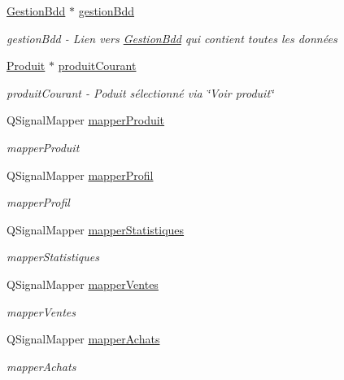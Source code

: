\begin{DoxyCompactItemize}
\hyperlink{class_gestion_bdd}{Gestion\-Bdd} $\ast$ \hyperlink{class_ma_fenetre_a34d71a96cedb508c72afb02c70ff9609}{gestion\-Bdd}
\begin{DoxyCompactList}\small\item\em gestion\-Bdd -\/ Lien vers \hyperlink{class_gestion_bdd}{Gestion\-Bdd} qui contient toutes les données \end{DoxyCompactList}\item 
\hyperlink{class_produit}{Produit} $\ast$ \hyperlink{class_ma_fenetre_abc16cc0e7668b65019bffe2d595be2a0}{produit\-Courant}
\begin{DoxyCompactList}\small\item\em produit\-Courant -\/ Poduit sélectionné via \char`\"{}\-Voir produit\char`\"{} \end{DoxyCompactList}\item 
Q\-Signal\-Mapper \hyperlink{class_ma_fenetre_a7345ec3b89dedf18ae6297d77c5653b4}{mapper\-Produit}
\begin{DoxyCompactList}\small\item\em mapper\-Produit \end{DoxyCompactList}\item 
Q\-Signal\-Mapper \hyperlink{class_ma_fenetre_a0629af8324c4d673fe70f55ead4e7b8a}{mapper\-Profil}
\begin{DoxyCompactList}\small\item\em mapper\-Profil \end{DoxyCompactList}\item 
Q\-Signal\-Mapper \hyperlink{class_ma_fenetre_ad5133adcd9cb734a07b9534996224d15}{mapper\-Statistiques}
\begin{DoxyCompactList}\small\item\em mapper\-Statistiques \end{DoxyCompactList}\item 
Q\-Signal\-Mapper \hyperlink{class_ma_fenetre_a68f5911be4ba075ef635413eee34b623}{mapper\-Ventes}
\begin{DoxyCompactList}\small\item\em mapper\-Ventes \end{DoxyCompactList}\item 
Q\-Signal\-Mapper \hyperlink{class_ma_fenetre_aec38227203ed7fa15ad565077697d661}{mapper\-Achats}
\begin{DoxyCompactList}\small\item\em mapper\-Achats \end{DoxyCompactList}\end{DoxyCompactItemize}


